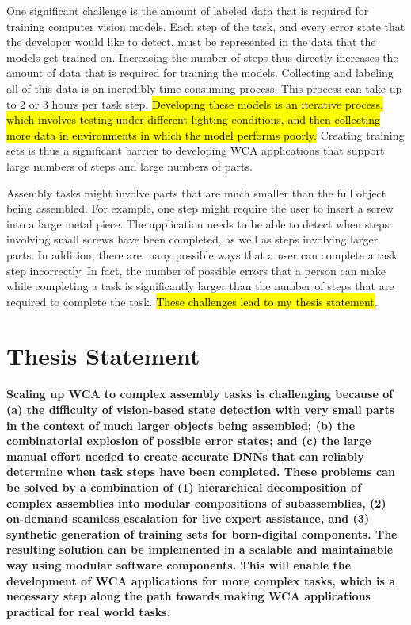 One significant challenge is the amount of labeled data that is required for
training computer vision models. Each
step of the task, and every error state that the developer would like to detect,
must be represented in the data that the models get trained on.
Increasing the number of steps thus directly increases the amount of data that
is required for training the models.
Collecting and labeling all of this data is an incredibly time-consuming
process.
This process can take up to 2 or 3 hours per task step.
\hl{Developing these models is an iterative process, which involves testing under
different lighting conditions, and then collecting more data in environments
in which the model performs poorly.}
Creating training sets is thus a significant barrier to developing WCA
applications that support large numbers of steps and large numbers of parts.

Assembly tasks might involve parts that are much smaller than the full object
being assembled.
For example, one step might require the user to insert a screw into a large
metal piece.
The application needs to be able to detect when steps involving small screws
have been completed, as well as steps involving larger parts.
In addition, there are many possible ways that a user can complete a task step
incorrectly.
In fact, the number of possible errors that a person can make while completing a
task is significantly larger than the number of steps that are required to
complete the task.
\hl{These challenges lead to my thesis statement}.

\section{Thesis Statement}

\textbf{
  Scaling up WCA to complex assembly tasks is challenging because of
  (a) the difficulty of
  vision-based state detection with very small parts in the context of much
  larger objects being assembled; (b) the combinatorial explosion
  of possible error states; and (c) the large manual effort needed to create
  accurate DNNs that can reliably determine when task steps have been completed.
  These problems can be solved by a combination of (1) hierarchical
  decomposition of
  complex assemblies into modular compositions of subassemblies, (2) on-demand
  seamless
  escalation for live expert assistance, and (3) synthetic generation of
  training
  sets for born-digital components. The resulting solution can be implemented in
  a scalable and maintainable way using modular software components.
  This will enable the development of WCA applications for more complex tasks,
  which is a necessary step along the path towards making WCA applications
  practical for real world tasks.
}

